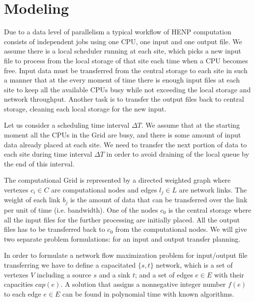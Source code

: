 \documentclass{svjour3}                     %
\begin{document}
\section{Modeling}
\label{modeling}
Due to a data level of parallelism a typical workflow of HENP computation
consists of independent jobs using one CPU, one input and one output file. We
assume there is a local scheduler running at each site, which picks a new
input file to process from the local storage of that site each time when a CPU becomes
free. Input data must be transferred from the central storage
to each site in such a manner that at the every moment of time there is enough
input files at each site to keep all the available CPUs busy while not
exceeding the local storage and network throughput. Another task
is to transfer the output files back to central storage, cleaning each local
storage for the new input.

Let us consider a scheduling time interval $\Delta T$. We assume that at the
starting moment all the CPUs in the Grid are busy, and there is some amount of
input data already placed at each site. We need to transfer the next portion
of data to each site during time interval $\Delta T$ in order to avoid
draining of the local queue by the end of this interval. 

The computational Grid is represented by a directed weighted graph where
vertexes $c_{i} \in C$ are computational nodes and edges $l_{j} \in L$ are
network links. The weight of each link $b_{j}$ is the amount of data that can be
transferred over the link per unit of time (i.e. bandwidth). One of the nodes
$c_{0}$ is the central storage where all the input files for the further
processing are initially placed. All the output files has to be transferred
back to $c_{0}$ from the computational nodes. We will give two separate
problem formulations: for an input and output transfer planning. 

In order to formulate a network flow maximization problem \cite{Network_flows}
for input/output file transferring we have to define a capacitated $\{s,t\}$
network, which is a set of vertexes $V$ including a source $s$ and a sink $t$;
and a set of edges $e\in E$ with their capacities $cap(e)$. A solution that
assigns a nonnegative integer number $f(e)$ to each edge $e \in E$ can be
found in polynomial time with known algorithms.
\end{document}
